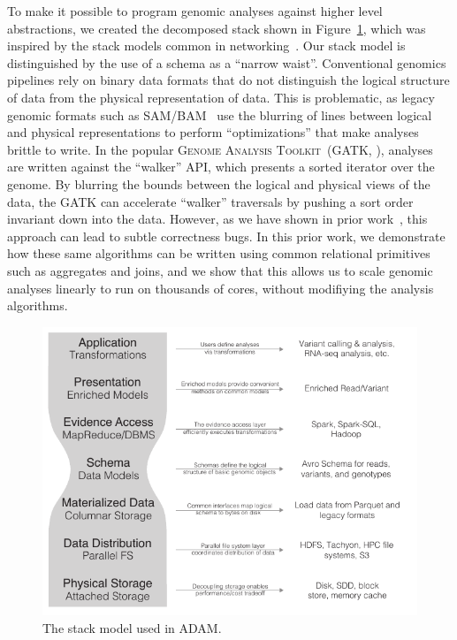 \documentclass[11pt]{article} %
\begin{document}
To make it possible to program genomic analyses against higher level abstractions, we created the
decomposed stack shown in Figure~\ref{fig:stack-model}, which was inspired by the stack models
common in networking~\cite{zimmermann80}. Our stack model is distinguished by the use of a
schema as a ``narrow waist''. Conventional genomics pipelines rely on binary
data formats that do not distinguish the logical structure of data from the physical representation
of data. This is problematic, as legacy genomic formats such as SAM/BAM~\cite{li09} use the
blurring of lines between logical and physical representations to perform ``optimizations''
that make analyses brittle to write. In the popular \textsc{Genome Analysis Toolkit}~(GATK,
\cite{mckenna10}), analyses are written against the ``walker'' API, which presents a sorted
iterator over the genome. By blurring the bounds between the logical and physical views of the
data, the \textsc{GATK} can accelerate ``walker'' traversals by pushing a sort order invariant
down into the data. However, as we have shown in prior work~\cite{nothaft15}, this approach
can lead to subtle correctness bugs. In this prior work, we demonstrate how these
same algorithms can be written using common relational primitives such as aggregates and joins,
and we show that this allows us to scale genomic analyses linearly to run on thousands of cores,
without modifiying the analysis algorithms.

\begin{figure}[h]
\begin{center}
\includegraphics[width=0.6\linewidth]{../ms-thesis/expanded-stack-2.pdf}
\caption{The stack model used in \textsc{ADAM}.}
\label{fig:stack-model}
\end{center}
\end{figure}
\end{document}
